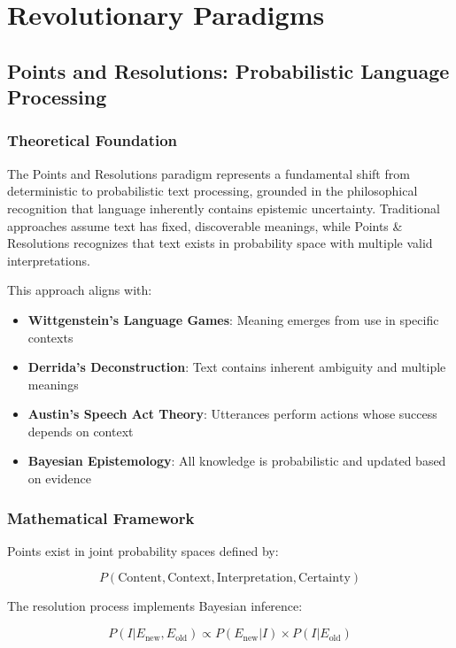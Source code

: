 \documentclass[12pt,a4paper,twoside]{article}
\begin{document}
\section{Revolutionary Paradigms}

\subsection{Points and Resolutions: Probabilistic Language Processing}

\subsubsection{Theoretical Foundation}

The Points and Resolutions paradigm represents a fundamental shift from deterministic to probabilistic text processing, grounded in the philosophical recognition that language inherently contains epistemic uncertainty. Traditional approaches assume text has fixed, discoverable meanings, while Points \& Resolutions recognizes that text exists in probability space with multiple valid interpretations.

This approach aligns with:
\begin{itemize}
\item \textbf{Wittgenstein's Language Games}: Meaning emerges from use in specific contexts
\item \textbf{Derrida's Deconstruction}: Text contains inherent ambiguity and multiple meanings
\item \textbf{Austin's Speech Act Theory}: Utterances perform actions whose success depends on context
\item \textbf{Bayesian Epistemology}: All knowledge is probabilistic and updated based on evidence
\end{itemize}

\subsubsection{Mathematical Framework}

Points exist in joint probability spaces defined by:

\begin{equation}
P(\text{Content}, \text{Context}, \text{Interpretation}, \text{Certainty})
\end{equation}

The resolution process implements Bayesian inference:

\begin{equation}
P(I|E_{\text{new}}, E_{\text{old}}) \propto P(E_{\text{new}}|I) \times P(I|E_{\text{old}})
\end{equation}
\end{document}
